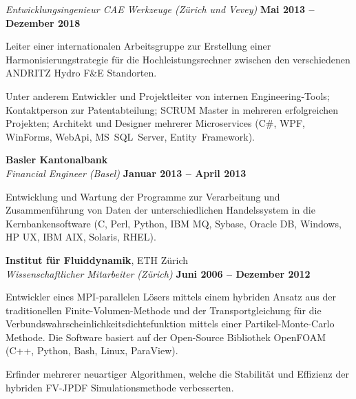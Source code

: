 \documentclass[line,11pt,a4paper]{../resume}
\begin{document}
\begin{resume}
\textsl{Entwicklungsingenieur CAE Werkzeuge (Zürich und Vevey)}
  \hfill \textbf{Mai 2013 -- Dezember 2018}\\
\vspace{-4mm}%
\begin{list2}
  \item Leiter einer internationalen Arbeitsgruppe zur Erstellung
    einer Harmonisierungstrategie für die Hochleistungsrechner zwischen den
    verschiedenen ANDRITZ Hydro F\&E Standorten.

  \item Unter anderem Entwickler und Projektleiter von internen
    Engineering-Tools; Kontaktperson zur Patentabteilung; SCRUM Master in
    mehreren erfolgreichen Projekten; Architekt und Designer mehrerer
    Microservices (C\#, WPF, WinForms, WebApi, MS~SQL~Server,
    Entity~Framework).
\end{list2}

\textbf{Basler Kantonalbank}\\\vspace{1mm}%
\textsl{Financial Engineer (Basel)}
  \hfill \textbf{Januar 2013 -- April 2013}\\
\vspace{-4mm}%
\begin{list2}
  \item Entwicklung und Wartung der Programme zur Verarbeitung und
    Zusammenführung von Daten der unterschiedlichen Handelssystem in die
    Kernbankensoftware (C, Perl, Python, IBM MQ, Sybase, Oracle DB, Windows, HP
    UX, IBM AIX, Solaris, RHEL).
\end{list2}

\textbf{Institut für Fluiddynamik}, ETH Zürich\\\vspace{1mm}%
\textsl{Wissenschaftlicher Mitarbeiter (Zürich)}
  \hfill \textbf{Juni 2006 -- Dezember 2012}\\
\vspace{-4mm}%
\begin{list2}
  \item Entwickler eines MPI-parallelen Lösers mittels einem hybriden Ansatz aus
    der traditionellen Finite-Volumen-Methode und der Transportgleichung für
    die Verbundswahrscheinlichkeitsdichtefunktion mittels einer
    Partikel-Monte-Carlo Methode. Die Software basiert auf der Open-Source
    Bibliothek OpenFOAM (C++, Python, Bash, Linux, ParaView).

  \item Erfinder mehrerer neuartiger Algorithmen, welche die Stabilität und
    Effizienz der hybriden FV-JPDF Simulationsmethode verbesserten.
\end{list2}


\end{resume}
\end{document}
